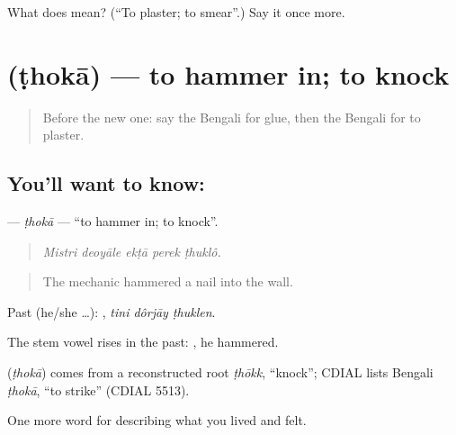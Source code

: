\begin{tcolorbox}[breakable,colback=teal!4,colframe=teal!35!black,title={Before you move on}]
What does  mean? (\textquotedblleft{}To plaster; to smear\textquotedblright{}.) Say it once more.
\end{tcolorbox}
\section[\texorpdfstring{\bn{ঠোকা} (ṭhokā)}{ঠোকা (ṭhokā)}]{ (ṭhokā) — to hammer in; to knock}

\label{lesson:BN-C507-thoka}



\begin{quote}
Before the new one: say the Bengali for glue, then the Bengali for to plaster.
\end{quote}

\subsection*{You'll want to know: }
\textbf{} — \emph{ṭhokā} — \textquotedblleft{}to hammer in; to knock\textquotedblright{}.

\begin{quote}
    
\end{quote}

\begin{quote}
\emph{Mistri deoyāle ekṭā perek ṭhuklô.}
\end{quote}

\begin{quote}
The mechanic hammered a nail into the wall.
\end{quote}

Past (he/she …):   , \emph{tini dôrjāy ṭhuklen}.

The stem vowel rises in the past: , he hammered.

\begin{cousinweb}
\textbf{} (\emph{ṭhokā}) comes from a reconstructed root \emph{ṭhōkk}, \textquotedblleft{}knock\textquotedblright{}; CDIAL lists Bengali \emph{ṭhokā}, \textquotedblleft{}to strike\textquotedblright{} (CDIAL 5513).
\end{cousinweb}

\begin{grammarlens}[title={What you've built}]
One more word for describing what you lived and felt.
\end{grammarlens}

